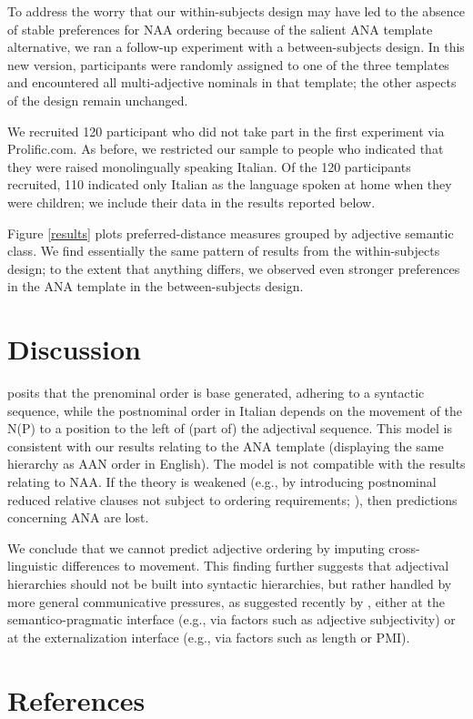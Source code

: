 \documentclass[11pt]{article}
\begin{document}
To address the worry that our within-subjects design may have led to the absence of stable preferences for NAA ordering because of the salient ANA template alternative, we ran a follow-up experiment with a between-subjects design. In this new version, participants were randomly assigned to one of the three templates and encountered all multi-adjective nominals in that template; the other aspects of the design remain  unchanged.

We recruited 120 participant who did not take part in the first experiment via Prolific.com. As before, we restricted our sample to people who indicated that they were raised monolingually speaking Italian. Of the 120 participants recruited, 110 indicated only Italian as the language spoken at home when they were children; we include their data in the results reported below.
 
Figure \ref{results} plots preferred-distance measures grouped by adjective semantic class. We find essentially the same pattern of results from the within-subjects design; to the extent that anything differs, we observed even stronger preferences in the ANA template in the between-subjects design.


\section{Discussion}

\cite{cinque1994, cinque2010} posits that the prenominal order is base generated, adhering to a syntactic sequence, while the postnominal order in Italian depends on the movement of the N(P) to a position to the left of (part of) the adjectival sequence. This model is consistent with our results relating to the ANA template (displaying the same hierarchy as AAN order in English). The model is not compatible with the results relating to NAA. If the theory is weakened (e.g., by introducing postnominal reduced relative clauses not subject to ordering requirements; \citealp{cinque2010}), then predictions concerning ANA are lost. 

We conclude that we cannot predict adjective ordering by imputing cross-linguistic differences to movement. This finding further suggests that adjectival hierarchies should not be built into syntactic hierarchies, but rather handled by more general communicative pressures, as suggested recently by \cite{scontrasetal2017adjectives,scontrasetal2019adjectives,futrelletal2020,dyeretal2023}, either at the semantico-pragmatic interface (e.g., via factors such as adjective subjectivity) or at the externalization interface (e.g., via factors such as length or PMI).


\section*{References}



\end{document}
